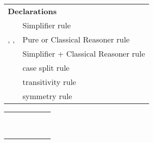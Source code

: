 \begin{isabellebody}
\begin{isamarkuptext}
\begin{tabular}{ll}
    \multicolumn{2}{l}{\textbf{Declarations}} \\[0.5ex]
    \mbox{\isa{simp}} & Simplifier rule \\
    \mbox{\isa{intro}}, \mbox{\isa{elim}}, \mbox{\isa{dest}} & Pure or Classical Reasoner rule \\
    \mbox{\isa{iff}} & Simplifier + Classical Reasoner rule \\
    \mbox{\isa{split}} & case split rule \\
    \mbox{\isa{trans}} & transitivity rule \\
    \mbox{\isa{sym}} & symmetry rule \\
  \end{tabular}%
\end{isamarkuptext}%
\isamarkuptrue%
%
\isamarkuptrue%
%
\begin{isamarkuptext}%
\begin{tabular}{l|lllll}
      & \mbox{\isa{rule}} & \mbox{\isa{iprover}} & \mbox{\isa{blast}} & \mbox{\isa{simp}} & \mbox{\isa{auto}} \\
      &                &                   & \mbox{\isa{fast}} & \mbox{\isa{simp{\isacharunderscore}all}} & \mbox{\isa{force}} \\
    \hline
    \mbox{\isa{Pure{\isachardot}elim}}\isa{{\isacharbang}} \mbox{\isa{Pure{\isachardot}intro}}\isa{{\isacharbang}}
      & \isa{{\isasymtimes}}    & \isa{{\isasymtimes}} \\
    \mbox{\isa{Pure{\isachardot}elim}} \mbox{\isa{Pure{\isachardot}intro}}
      & \isa{{\isasymtimes}}    & \isa{{\isasymtimes}} \\
    \mbox{\isa{elim}}\isa{{\isacharbang}} \mbox{\isa{intro}}\isa{{\isacharbang}}
      & \isa{{\isasymtimes}}    &                    & \isa{{\isasymtimes}}          &                     & \isa{{\isasymtimes}} \\
    \mbox{\isa{elim}} \mbox{\isa{intro}}
      & \isa{{\isasymtimes}}    &                    & \isa{{\isasymtimes}}          &                     & \isa{{\isasymtimes}} \\
    \mbox{\isa{iff}}
      & \isa{{\isasymtimes}}    &                    & \isa{{\isasymtimes}}          & \isa{{\isasymtimes}}         & \isa{{\isasymtimes}} \\
    \mbox{\isa{iff}}\isa{{\isacharquery}}
      & \isa{{\isasymtimes}} \\
    \mbox{\isa{elim}}\isa{{\isacharquery}} \mbox{\isa{intro}}\isa{{\isacharquery}}
      & \isa{{\isasymtimes}} \\

\end{tabular}
\end{isamarkuptext}
\end{isabellebody}
